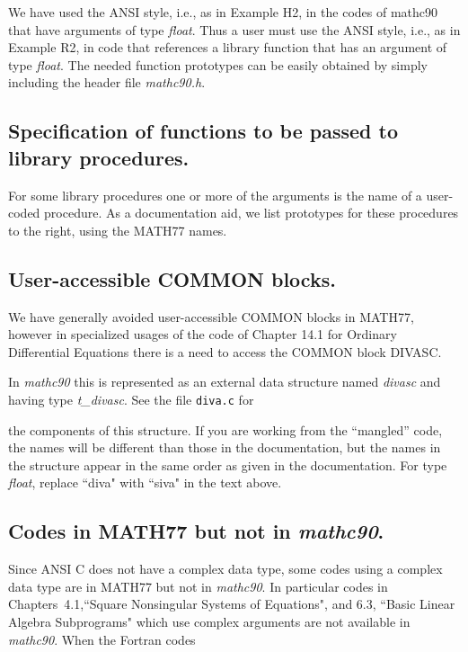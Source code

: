 \documentclass[twoside]{MATH77}
\begin{document}
\begin{minipage}{1.95in}
We have used the ANSI style, i.e., as in Example H2, in the codes of
mathc90 that have arguments of type {\em float}.  Thus a user must use
the ANSI style, i.e., as in Example R2, in code that references a
library function that has an argument of type {\em float}.  The needed
function prototypes can be easily obtained by simply including the
header file {\em mathc90.h}.

\subsection{Specification of\newline
functions to be\newline
passed to library\newline
procedures.\label{functions}}

For some library procedures one or more of the arguments is the name of a
user-coded procedure. As a documentation aid, we list prototypes for these
procedures to the right, using the MATH77 names.

\subsection{User-accessible COMMON blocks.\label{common}}

We have generally avoided user-accessible COMMON blocks in MATH77,
however in specialized usages of the code of Chapter 14.1 for
Ordinary Differential Equations there is a need to access the COMMON
block DIVASC.

In {\em mathc90} this is represented as an external data structure named {\em
divasc} and having type {\em t\_divasc}. \hfill See the file {\tt diva.c} for
\end{minipage}\vspace{-3pt}

the components of this structure. If you are working from the
``mangled'' code, the names will be different than those in the documentation,
but the names in the structure appear in the same order as given in the
documentation.  For type {\em float}, replace ``diva" with ``siva" in the text
above.

\subsection{Codes in MATH77 but not in {\em mathc90}.\label{MATH77_not_mathc90}}

Since ANSI C does not have a complex data type, some codes using a complex
data type are in MATH77 but not in {\em mathc90}.  In particular codes in
Chapters~4.1,``Square Nonsingular Systems of Equations", and 6.3, ``Basic
Linear Algebra Subprograms" which use complex arguments are not
available in {\em mathc90}. \hfill When the Fortran codes
\end{document}

